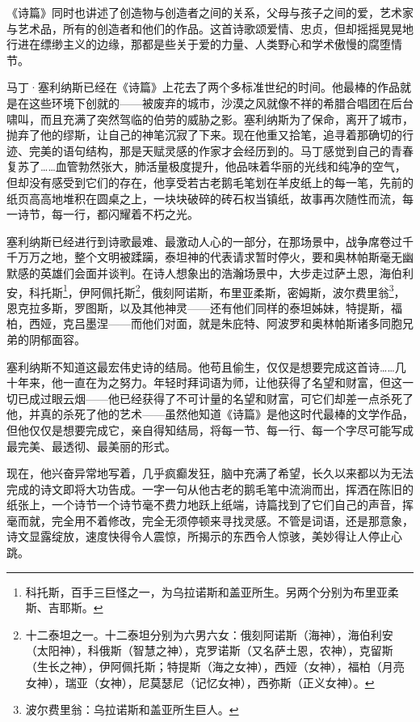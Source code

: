 \documentclass[AutoFakeBold=true]{book}
\begin{document}
《诗篇》同时也讲述了创造物与创造者之间的关系，父母与孩子之间的爱，艺术家与艺术品，所有的创造者和他们的作品。这首诗歌颂爱情、忠贞，但却摇摇晃晃地行进在缥缈主义的边缘，那都是些关于爱的力量、人类野心和学术傲慢的腐堕情节。

马丁·塞利纳斯已经在《诗篇》上花去了两个多标准世纪的时间。他最棒的作品就是在这些环境下创就的——被废弃的城市，沙漠之风就像不祥的希腊合唱团在后台啸叫，而且充满了突然驾临的伯劳的威胁之影。塞利纳斯为了保命，离开了城市，抛弃了他的缪斯，让自己的神笔沉寂了下来。现在他重又拾笔，追寻着那确切的行迹、完美的语句结构，那是天赋灵感的作家才会经历到的。马丁感觉到自己的青春复苏了……血管勃然张大，肺活量极度提升，他品味着华丽的光线和纯净的空气，但却没有感受到它们的存在，他享受若古老鹅毛笔划在羊皮纸上的每一笔，先前的纸页高高地堆积在圆桌之上，一块块破碎的砖石权当镇纸，故事再次随性而流，每一诗节，每一行，都闪耀着不朽之光。

塞利纳斯已经进行到诗歌最难、最激动人心的一部分，在那场景中，战争席卷过千千万万之地，整个文明被蹂躏，泰坦神的代表请求暂时停火，要和奥林帕斯毫无幽默感的英雄们会面并谈判。在诗人想象出的浩瀚场景中，大步走过萨土恩，海伯利安，科托斯\footnote{科托斯，百手三巨怪之一，为乌拉诺斯和盖亚所生。另两个分别为布里亚柔斯、吉耶斯。}，伊阿佩托斯\footnote{十二泰坦之一。十二泰坦分别为六男六女：俄刻阿诺斯（海神），海伯利安（太阳神），科俄斯（智慧之神），克罗诺斯（又名萨土恩，农神），克留斯（生长之神），伊阿佩托斯；特提斯（海之女神），西娅（女神），福柏（月亮女神），瑞亚（女神），尼莫瑟尼（记忆女神），西弥斯（正义女神）。}，俄刻阿诺斯，布里亚柔斯，密姆斯，波尔费里翁\footnote{波尔费里翁：乌拉诺斯和盖亚所生巨人。}，恩克拉多斯，罗图斯，以及其他神灵——还有他们同样的泰坦姊妹，特提斯，福柏，西娅，克吕墨涅——而他们对面，就是朱庇特、阿波罗和奥林帕斯诸多同胞兄弟的阴郁面容。

塞利纳斯不知道这最宏伟史诗的结局。他苟且偷生，仅仅是想要完成这首诗……几十年来，他一直在为之努力。年轻时拜词语为师，让他获得了名望和财富，但这一切已成过眼云烟——他已经获得了不可计量的名望和财富，可它们却差一点杀死了他，并真的杀死了他的艺术——虽然他知道《诗篇》是他这时代最棒的文学作品，但他仅仅是想要完成它，亲自得知结局，将每一节、每一行、每一个字尽可能写成最完美、最透彻、最美丽的形式。

现在，他兴奋异常地写着，几乎疯癫发狂，脑中充满了希望，长久以来都以为无法完成的诗文即将大功告成。一字一句从他古老的鹅毛笔中流淌而出，挥洒在陈旧的纸张上，一个诗节一个诗节毫不费力地跃上纸端，诗篇找到了它们自己的声音，挥毫而就，完全用不着修改，完全无须停顿来寻找灵感。不管是词语，还是那意象，诗文显露绽放，速度快得令人震惊，所揭示的东西令人惊骇，美妙得让人停止心跳。
\end{document}
